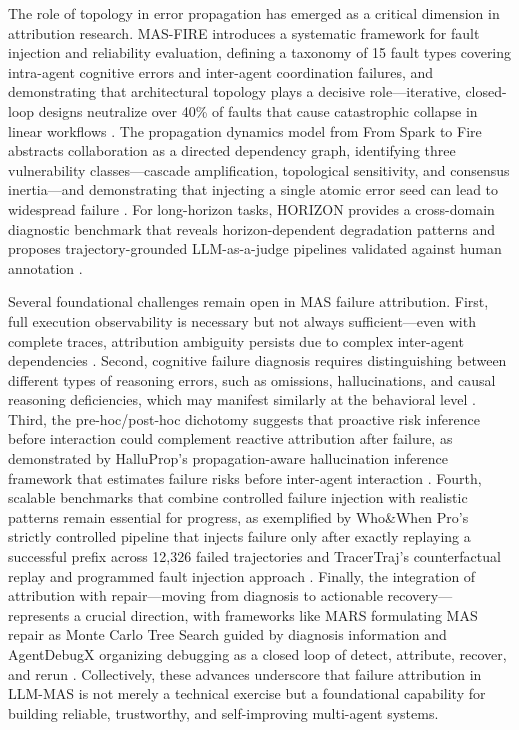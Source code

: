 \documentclass[11pt]{article}
\begin{document}
The role of topology in error propagation has emerged as a critical dimension in attribution research. MAS-FIRE introduces a systematic framework for fault injection and reliability evaluation, defining a taxonomy of 15 fault types covering intra-agent cognitive errors and inter-agent coordination failures, and demonstrating that architectural topology plays a decisive role---iterative, closed-loop designs neutralize over 40\% of faults that cause catastrophic collapse in linear workflows \cite{ref348}. The propagation dynamics model from From Spark to Fire abstracts collaboration as a directed dependency graph, identifying three vulnerability classes---cascade amplification, topological sensitivity, and consensus inertia---and demonstrating that injecting a single atomic error seed can lead to widespread failure \cite{ref383}. For long-horizon tasks, HORIZON provides a cross-domain diagnostic benchmark that reveals horizon-dependent degradation patterns and proposes trajectory-grounded LLM-as-a-judge pipelines validated against human annotation \cite{ref384}.

Several foundational challenges remain open in MAS failure attribution. First, full execution observability is necessary but not always sufficient---even with complete traces, attribution ambiguity persists due to complex inter-agent dependencies \cite{ref346}. Second, cognitive failure diagnosis requires distinguishing between different types of reasoning errors, such as omissions, hallucinations, and causal reasoning deficiencies, which may manifest similarly at the behavioral level \cite{ref385}. Third, the pre-hoc/post-hoc dichotomy suggests that proactive risk inference before interaction could complement reactive attribution after failure, as demonstrated by HalluProp's propagation-aware hallucination inference framework that estimates failure risks before inter-agent interaction \cite{ref386}. Fourth, scalable benchmarks that combine controlled failure injection with realistic patterns remain essential for progress, as exemplified by Who\&When Pro's strictly controlled pipeline that injects failure only after exactly replaying a successful prefix across 12,326 failed trajectories \cite{ref387} and TracerTraj's counterfactual replay and programmed fault injection approach \cite{ref388}. Finally, the integration of attribution with repair---moving from diagnosis to actionable recovery---represents a crucial direction, with frameworks like MARS formulating MAS repair as Monte Carlo Tree Search guided by diagnosis information \cite{ref389} and AgentDebugX organizing debugging as a closed loop of detect, attribute, recover, and rerun \cite{ref390}. Collectively, these advances underscore that failure attribution in LLM-MAS is not merely a technical exercise but a foundational capability for building reliable, trustworthy, and self-improving multi-agent systems.
\end{document}
